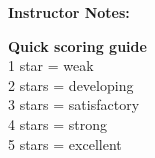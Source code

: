 \documentclass[10pt]{article}
\begin{document}
\vspace{0.45em}
\noindent\begin{minipage}[t]{0.64\linewidth}
\textbf{Instructor Notes:}\\[0.25em]
\fbox{\parbox[c][1.45in][t]{\dimexpr\linewidth-2\fboxsep-2\fboxrule\relax}{\vspace{0.15em}}}
\end{minipage}\hfill
\begin{minipage}[t]{0.33\linewidth}
\small
\textbf{Quick scoring guide}\\[0.2em]
1 star = weak\\
2 stars = developing\\
3 stars = satisfactory\\
4 stars = strong\\
5 stars = excellent
\end{minipage}
\end{document}
